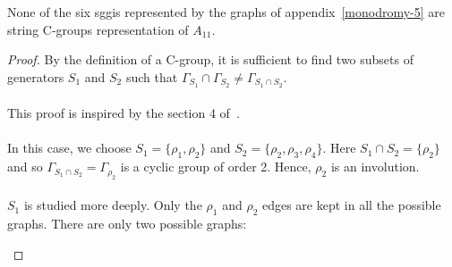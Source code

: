 \begin{lemma}
  \label{exclude-2}
  None of the six sggis represented by the graphs of appendix~\ref{monodromy-5} are string C-groups representation of $A_{11}$.
\end{lemma}

\begin{proof}
  By the definition of a C-group, it is sufficient to find two subsets of generators $S_1$ and $S_2$ such that $\Gamma_{S_1} \cap \Gamma_{S_2} \neq \Gamma_{S_1 \cap S_2}$.

  \paragraph{}
  This proof is inspired by the section 4 of~\cite{leemansTransactions}.

  \paragraph{}
  In this case, we choose $S_1 = \{\rho_1, \rho_2\}$ and $S_2 = \{\rho_2, \rho_3, \rho_4\}$. Here $S_1 \cap S_2 = \{\rho_2\}$ and so $\Gamma_{S_1 \cap S_2} = \Gamma_{\rho_2}$ is a cyclic group of order 2. Hence, $\rho_2$ is an involution.

  \paragraph{}
  $S_1$ is studied more deeply. Only the $\rho_1$ and $\rho_2$ edges are kept in all the possible graphs. There are only two possible graphs:

  \begin{figure}[H]
    \begin{center}
\end{center}
\end{figure}
\end{proof}
